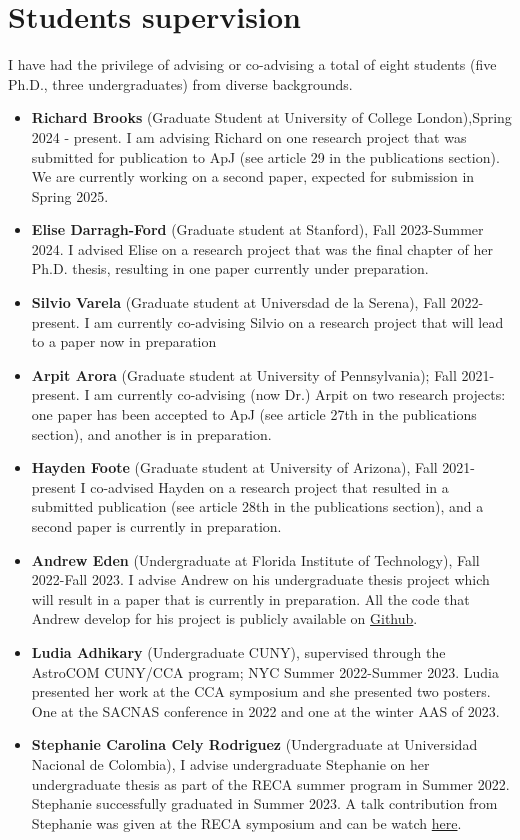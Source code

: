 \documentclass[14pt]{article}
\begin{document}
\section*{Students supervision}
I have had the privilege of advising or co-advising a total of eight students
(five Ph.D., three undergraduates) from diverse backgrounds. 


\begin{itemize}
  \setlength\itemsep{0.0em}
  \renewcommand\labelitemi{$\cdot$}
  \item \textbf{Richard Brooks} (Graduate Student at University of College
    London),Spring 2024 - present. I am advising Richard on one research project that
    was submitted for publication to ApJ (see article 29 in the publications
    section). We are currently working on a second paper, expected for
    submission in Spring 2025.
  \item \textbf{Elise Darragh-Ford} (Graduate student at Stanford), Fall 2023-Summer
    2024. I advised Elise on a research project that was the  final chapter of her Ph.D. thesis, 
    resulting in one paper currently under preparation.  
  \item \textbf{Silvio Varela} (Graduate student at Universdad de la Serena), Fall 2022-present. I am currently 
    co-advising Silvio on a research project that will lead to a paper now in preparation
  \item \textbf{Arpit Arora} (Graduate student at University of Pennsylvania);
    Fall 2021-present. I am currently co-advising (now Dr.) Arpit on two
    research projects: one paper has been accepted to ApJ (see article 27th in the publications section), and another is in preparation.
  \item \textbf{Hayden Foote} (Graduate student at University of Arizona), Fall
    2021-present I co-advised Hayden on a research project that resulted in a
    submitted publication (see article 28th in the publications section), and a second paper 
    is currently in preparation.
  \item \textbf{Andrew Eden} (Undergraduate at Florida Institute of Technology),
    Fall 2022-Fall 2023. I advise Andrew on his undergraduate thesis project which
    will result in a paper that is currently in preparation. All the code that
    Andrew develop for his project is publicly available on \href{https://github.com/aeden2019/rubin_mw_mocks}{Github}. 
  \item \textbf{Ludia Adhikary} (Undergraduate CUNY), supervised through the AstroCOM CUNY/CCA program; NYC Summer 2022-Summer 2023. Ludia
    presented her work at the CCA symposium and she presented two posters. One
    at the SACNAS conference in 2022 and one at the winter AAS of 2023. 
  \item \textbf{Stephanie Carolina Cely Rodriguez} (Undergraduate at Universidad
    Nacional de Colombia), I advise undergraduate Stephanie on her undergraduate thesis as part of the
   RECA summer program in  Summer 2022. Stephanie successfully graduated in
   Summer 2023. A talk contribution from Stephanie was given at the RECA
   symposium and can be watch \href{https://www.youtube.com/watch?v=5SeOW060m24&t=1774s}{here}.
\end{itemize}
\end{document}
